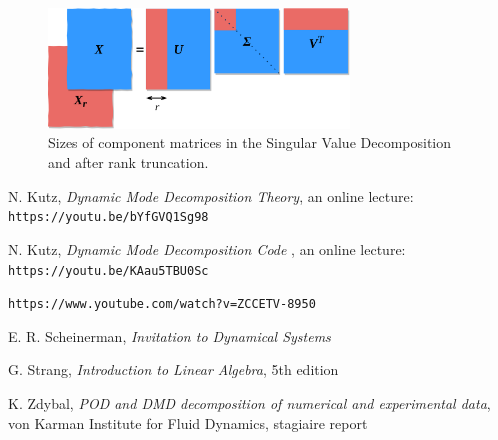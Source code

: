\documentclass[10pt,twocolumn]{article}
\begin{document}
\begin{figure}[H]
\centering\includegraphics[width=8cm]{svd.png}
\caption{Sizes of component matrices in the Singular Value Decomposition and after rank truncation.}
\label{fig:linear_system}
\end{figure}


\thebibliography{}

 N. Kutz, \textit{Dynamic Mode Decomposition Theory}, an online lecture: \verb|https://youtu.be/bYfGVQ1Sg98| \label{bib:kutz_1}

 N. Kutz, \textit{Dynamic Mode Decomposition Code }, an online lecture: \verb|https://youtu.be/KAau5TBU0Sc| \label{bib:kutz_2}

 \verb|https://www.youtube.com/watch?v=ZCCETV-8950| \label{bib:andymation}

 E. R. Scheinerman, \textit{Invitation to Dynamical Systems}

 G. Strang, \textit{Introduction to Linear Algebra}, 5th edition

 K. Zdybal, \textit{POD and DMD decomposition of numerical and experimental data}, von Karman Institute for Fluid Dynamics, stagiaire report 
\end{document}
